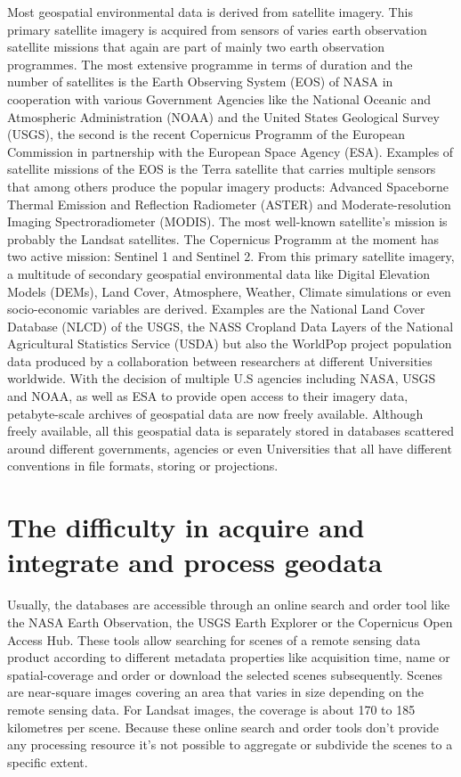 \documentclass[11pt,twoside,a4paper,final]{report}
\begin{document}
Most geospatial environmental data is derived from satellite imagery. This primary satellite imagery is acquired from sensors of varies earth observation satellite missions that again are part of mainly two earth observation programmes. The most extensive programme in terms of duration and the number of satellites is the Earth Observing System (EOS) of NASA in cooperation with various Government Agencies like the National Oceanic and Atmospheric Administration (NOAA) and the United States Geological Survey (USGS), the second is the recent Copernicus Programm of the European Commission in partnership with the European Space Agency (ESA). Examples of satellite missions of the EOS is the Terra satellite that carries multiple sensors that among others produce the popular imagery products: Advanced Spaceborne Thermal Emission and Reflection Radiometer (ASTER) and Moderate-resolution Imaging Spectroradiometer (MODIS). The most well-known satellite's mission is probably the Landsat satellites. The Copernicus Programm at the moment has two active mission: Sentinel 1 and Sentinel 2.
From this primary satellite imagery, a multitude of secondary geospatial environmental data like Digital Elevation Models (DEMs), Land Cover, Atmosphere, Weather, Climate simulations or even socio-economic variables are derived. Examples are the National Land Cover Database (NLCD) of the USGS, the NASS Cropland Data Layers of the National Agricultural Statistics Service (USDA) but also the WorldPop project population data produced by a collaboration between researchers at different Universities worldwide. 
With the decision of multiple U.S agencies including NASA, USGS and NOAA, as well as ESA to provide open access to their imagery data, petabyte-scale archives of geospatial data are now freely available.
Although freely available, all this geospatial data is separately stored in databases scattered around different governments, agencies or even Universities that all have different conventions in file formats, storing or projections. 

\section{The difficulty in acquire and integrate and process geodata}

Usually, the databases are accessible through an online search and order tool like the NASA Earth Observation, the USGS Earth Explorer or the Copernicus Open Access Hub. These tools allow searching for scenes of a remote sensing data product according to different metadata properties like acquisition time, name or spatial-coverage and order or download the selected scenes subsequently. 
Scenes are near-square images covering an area that varies in size depending on the remote sensing data. For Landsat images, the coverage is about 170 to 185 kilometres per scene. Because these online search and order tools don't provide any processing resource it's not possible to aggregate or subdivide the scenes to a specific extent.
\end{document}
